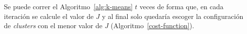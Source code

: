 Se puede correr el Algoritmo~\ref{alg:k-means} $t$ veces de forma que, en cada
 iteración se calcule el valor de $J$ y al final solo quedaría escoger la
  configuración de \textit{clusters} con el menor valor de $J$ 
  (Algoritmo~\ref{cost-function}). 


